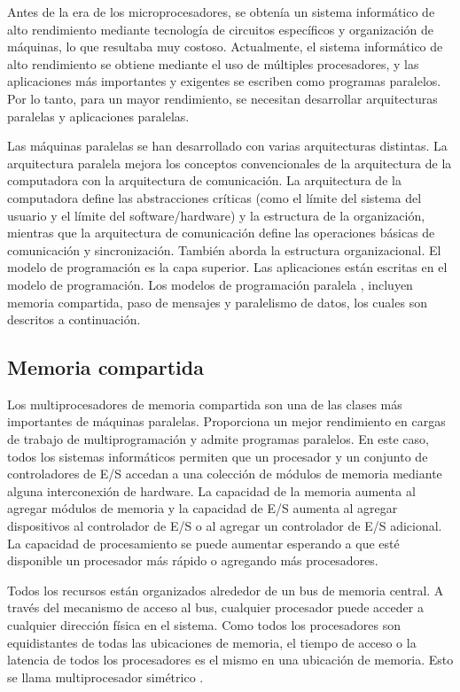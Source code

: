 Antes de la era de los microprocesadores, se obtenía un sistema informático de alto rendimiento mediante tecnología de circuitos específicos y organización de máquinas, lo que resultaba muy costoso. Actualmente, el sistema informático de alto rendimiento se obtiene mediante el uso de múltiples procesadores, y las aplicaciones más importantes y exigentes se escriben como programas paralelos. Por lo tanto, para un mayor rendimiento, se necesitan desarrollar arquitecturas paralelas y aplicaciones paralelas.

Las máquinas paralelas se han desarrollado con varias arquitecturas distintas. La arquitectura paralela mejora los conceptos convencionales de la arquitectura de la computadora con la arquitectura de comunicación. La arquitectura de la computadora define las abstracciones críticas (como el límite del sistema del usuario y el límite del software/hardware) y la estructura de la organización, mientras que la arquitectura de comunicación define las operaciones básicas de comunicación y sincronización. También aborda la estructura organizacional. El modelo de programación es la capa superior. Las aplicaciones están escritas en el modelo de programación. Los modelos de programación paralela \cite{sharedVsMpi}, \cite{nitzberg1991distributed} incluyen memoria compartida, paso de mensajes y paralelismo de datos, los cuales son descritos a continuación.

\subsection{Memoria compartida}
\label{sec:memoria_compartida}
Los multiprocesadores de memoria compartida son una de las clases más importantes de máquinas paralelas. Proporciona un mejor rendimiento en cargas de trabajo de multiprogramación y admite programas paralelos. En este caso, todos los sistemas informáticos permiten que un procesador y un conjunto de controladores de E/S accedan a una colección de módulos de memoria mediante alguna interconexión de hardware. La capacidad de la memoria aumenta al agregar módulos de memoria y la capacidad de E/S aumenta al agregar dispositivos al controlador de E/S o al agregar un controlador de E/S adicional. La capacidad de procesamiento se puede aumentar esperando a que esté disponible un procesador más rápido o agregando más procesadores.

Todos los recursos están organizados alrededor de un bus de memoria central. A través del mecanismo de acceso al bus, cualquier procesador puede acceder a cualquier dirección física en el sistema. Como todos los procesadores son equidistantes de todas las ubicaciones de memoria, el tiempo de acceso o la latencia de todos los procesadores es el mismo en una ubicación de memoria. Esto se llama multiprocesador simétrico \cite{bertogna2007response}.

